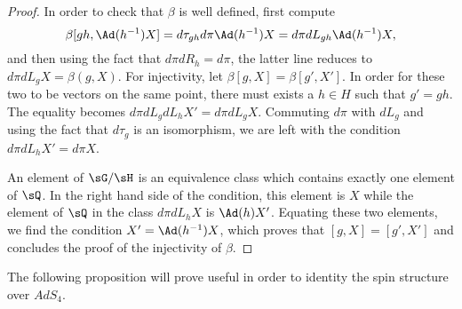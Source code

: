 \begin{proof}

 In order to check that $\beta$ is well defined, first compute
\[ 
  \beta[gh,\Ad(h^{-1})X]=d\tau_{gh}d\pi\Ad(h^{-1})X=d\pi dL_{gh}\Ad(h^{-1})X,
\]
and then using the fact that $d\pi dR_h=d\pi$, the latter line reduces to $d\pi dL_gX=\beta(g,X)$. For injectivity, let $\beta[g,X]=\beta[g',X']$. In order for these two to be vectors on the same point, there must exists a $h\in H$ such that $g'=gh$. The equality becomes $d\pi dL_g dL_h X'=d\pi dL_gX$. Commuting $d\pi$ with $dL_g$ and using the fact that $d\tau_g$ is an isomorphism, we are left with the condition $d\pi dL_h X'=d\pi X$.

An element of $\sG/\sH$ is an equivalence class which contains exactly one element of $\sQ$. In the right hand side of the condition, this element is $X$ while the element of $\sQ$ in the class $d\pi dL_h X$ is $\Ad(h)X'$. Equating these two elements, we find the condition $X'=\Ad(h^{-1})X$, which proves that $[g,X]=[g',X']$ and concludes the proof of the injectivity of $\beta$.
\end{proof}

The following proposition will prove useful in order to identity the spin structure over $AdS_4$.

